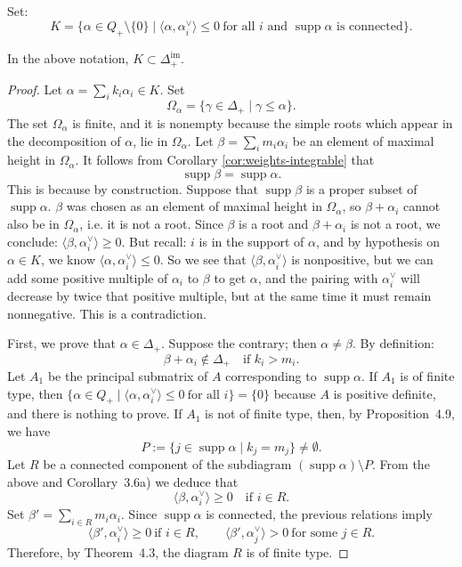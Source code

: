 \documentclass[12pt]{article}
\begin{document}
Set:
\[
    K = \{\alpha \in Q_+ \setminus \{0\} \mid \langle \alpha, \alpha_i^\vee \rangle
    \leq 0 \ \text{for all $i$ and $\operatorname{supp}\alpha$ is connected}\}.
\]

\begin{lemma}\label{lem:key-imaginary}
    In the above notation, $K \subset \Delta^{\mathrm{im}}_+$.
\end{lemma}

\begin{proof}
    Let $\alpha = \sum_i k_i \alpha_i \in K$. Set
    \[
        \Omega_\alpha = \{\gamma \in \Delta_+ \mid \gamma \leq \alpha\}.
    \]
    The set $\Omega_\alpha$ is finite, and it is nonempty because the simple roots which appear in the decomposition of $\alpha$, lie in $\Omega_\alpha$. Let
    $\beta = \sum_i m_i \alpha_i$ be an element of maximal height in $\Omega_\alpha$.
    It follows from Corollary \ref{cor:weights-integrable} that
    \[
        \operatorname{supp}\beta = \operatorname{supp}\alpha.
    \]
    This is because by construction. Suppose that $\operatorname{supp}\beta$ is a proper subset of $\operatorname{supp}\alpha$. $\beta$ was chosen as an element of maximal height in $\Omega_\alpha$, so $\beta + \alpha_i$ cannot also be in $\Omega_\alpha$, i.e. it is not a root. Since $\beta$ is a root and $\beta + \alpha_i$ is not a root, we conclude:
    $\langle \beta, \alpha_i^\vee \rangle \geq 0$. But recall: $i$ is in the support of $\alpha$, and by hypothesis on $\alpha \in K$, we know
    $\langle \alpha, \alpha_i^\vee \rangle \leq 0$. So we see that $\langle \beta, \alpha_i^\vee \rangle$ is nonpositive, but we can add some positive multiple of $\alpha_i$ to $\beta$ to get $\alpha$, and the pairing with $\alpha_i^\vee$ will decrease by twice that positive multiple, but at the same time it must remain nonnegative. This is a contradiction.


    First, we prove that $\alpha \in \Delta_+$. Suppose the contrary; then
    $\alpha \neq \beta$. By definition:
    \[
        \beta + \alpha_i \notin \Delta_+ \quad \text{if } k_i > m_i.
    \]
    Let $A_1$ be the principal submatrix of $A$ corresponding to $\operatorname{supp}\alpha$.
    If $A_1$ is of finite type, then
    $\{\alpha \in Q_+ \mid \langle \alpha,\alpha_i^\vee\rangle \leq 0 \ \text{for all $i$}\}=\{0\}$ because $A$ is positive definite,
    and there is nothing to prove. If $A_1$ is not of finite type, then, by Proposition~4.9,
    we have
    \[
        P := \{j \in \operatorname{supp}\alpha \mid k_j = m_j\} \neq \emptyset.
    \]
    Let $R$ be a connected component of the subdiagram
    $(\operatorname{supp}\alpha)\setminus P$. From the above and Corollary~3.6a) we deduce that
    \[
        \langle \beta, \alpha_i^\vee \rangle \geq 0 \quad \text{if } i \in R.
    \]
    Set $\beta' = \sum_{i \in R} m_i \alpha_i$. Since $\operatorname{supp}\alpha$ is connected,
    the previous relations imply
    \[
        \langle \beta', \alpha_i^\vee \rangle \geq 0 \ \text{if } i \in R,
        \qquad \langle \beta', \alpha_j^\vee \rangle > 0 \ \text{for some $j \in R$.}
    \]
    Therefore, by Theorem~4.3, the diagram $R$ is of finite type.


\end{proof}
\end{document}
